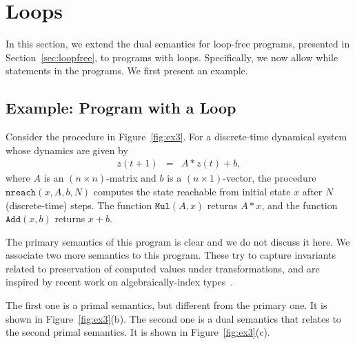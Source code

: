 \documentclass[preprint]{sig-alternate-05-2015}
\def\MMul{{\mathtt{Mul}}}
\def\VAdd{{\mathtt{Add}}}
\begin{document}
{%


\section{Loops}\label{sec:loops}

In this section, we extend the dual semantics for
loop-free programs, presented in Section~\ref{sec:loopfree},
to programs with loops. Specifically, we now allow
while statements in the programs.
We first present an example.

\subsection{Example: Program with a Loop}


Consider the procedure in Figure~\ref{fig:ex3}.
For a discrete-time dynamical system whose dynamics are
given by
\begin{eqnarray*}
z(t+1) & = & A*z(t) + b,
\end{eqnarray*}
where $A$ is an $(n\times n)$-matrix and
$b$ is a $(n\times 1)$-vector,
the procedure $\mathtt{nreach}(x,A,b,N)$ computes
the state reachable from initial state $x$ after
$N$ (discrete-time) steps.
The function $\MMul(A,x)$ returns $A*x$, and
the function $\VAdd(x,b)$ returns $x+b$.

The primary semantics of this program is clear and
we do not discuss it here.
We associate two more semantics to this program.
These try to capture invariants related to preservation
of computed values under transformations, and are inspired
by recent work on
algebraically-index types~\cite{DBLP:conf/popl/AtkeyJK13,DBLP:conf/popl/Atkey14}.

The first one is a primal semantics, but different from the
primary one. It is shown in Figure~\ref{fig:ex3}(b).
The second one is a dual semantics that relates to the
second primal semantics. It is shown in Figure~\ref{fig:ex3}(c).

}
\end{document}
